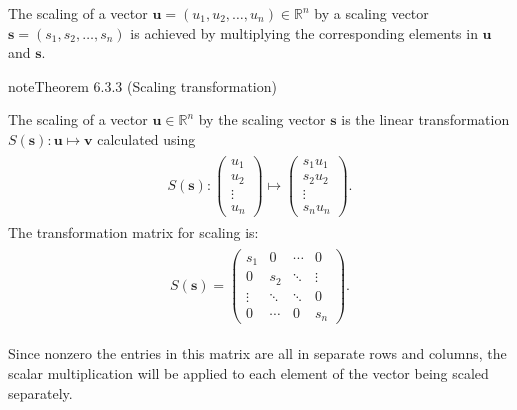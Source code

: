 \documentclass[letterpaper,10pt,english]{jupyterBook}
\begin{document}
\sphinxAtStartPar
The scaling of a vector \(\mathbf{u} = (u_1, u_2, \ldots, u_n) \in \mathbb{R}^n\) by a scaling vector \(\mathbf{s} = (s_1, s_2, \ldots, s_n)\) is achieved by multiplying the corresponding elements in \(\mathbf{u}\) and \(\mathbf{s}\).
\label{_pages/6.3_Rotation_reflection_and_translation:scaling-theorem}
\begin{sphinxadmonition}{note}{Theorem 6.3.3 (Scaling transformation)}



\sphinxAtStartPar
The scaling of a vector \(\mathbf{u} \in \mathbb{R}^n\) by the scaling vector \(\mathbf{s}\) is the linear transformation \(S(\mathbf{s}): \mathbf{u} \mapsto \mathbf{v}\) calculated using
\begin{equation*}
\begin{split} \begin{align*}
    S(\mathbf{s}): \begin{pmatrix} u_1 \\ u_2 \\ \vdots \\ u_n \end{pmatrix} \mapsto
    \begin{pmatrix} s_1 u_1 \\ s_2 u_2 \\ \vdots \\ s_n u_n \end{pmatrix}.
\end{align*} \end{split}
\end{equation*}
\sphinxAtStartPar
The transformation matrix for scaling is:
\begin{equation}\label{equation:_pages/6.3_Rotation_reflection_and_translation:scaling-matrix-equation}
\begin{split} \begin{align*}
    S(\mathbf{s}) =
    \begin{pmatrix}
        s_1 & 0 & \cdots & 0 \\
        0 & s_2 & \ddots & \vdots \\
        \vdots & \ddots & \ddots & 0 \\
        0 & \cdots & 0 & s_n
        \end{pmatrix}.
\end{align*} \end{split}
\end{equation}\end{sphinxadmonition}

\sphinxAtStartPar
Since non\sphinxhyphen{}zero the entries in this matrix are all in separate rows and columns, the scalar multiplication will be applied to each element of the vector being scaled separately.
\end{document}
